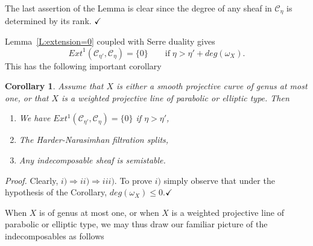 \documentclass[a4paper,10pt]{amsart}
\def\qed{$\hfill \checkmark$}
\newtheorem{cor}[theo]{Corollary}
\numberwithin{equation}{section}
\begin{document}
{The last assertion of the Lemma is clear since the degree of any sheaf in $\mathcal{C}_{\eta}$ is determined by its rank. \qed

\vspace{.15in}

Lemma~\ref{L:extension=0} coupled with Serre duality gives
$${Ext}^1(\mathcal{C}_{\eta'},\mathcal{C}_{\eta})=\{0\}\qquad \text{if}\;\eta>\eta'+deg(\omega_X).$$
This has the following important corollary

\vspace{.1in}

\begin{cor}\label{C:crucial} Assume that $X$ is either a smooth projective curve of genus at most one, or that $X$ is a weighted projective line of parabolic or elliptic type. Then
\begin{enumerate}
\item[i)] We have $Ext^1(\mathcal{C}_{\eta'},\mathcal{C}_{\eta})=\{0\}$ if $\eta > \eta'$,
\item[ii)] The Harder-Narasimhan filtration splits,
\item[iii)] Any indecomposable sheaf is semistable.
\end{enumerate}
\end{cor}
\noindent
\textit{Proof.} Clearly, $i) \Rightarrow ii) \Rightarrow iii)$. To prove $i)$ simply observe that under the hypothesis of the Corollary, $deg(\omega_X) \leq 0$.\qed

\vspace{.15in}

When $X$ is of genus at most one, or when $X$ is a weighted projective line of parabolic or elliptic type, we may thus draw our familiar picture of the indecomposables as follows

}
\end{document}
